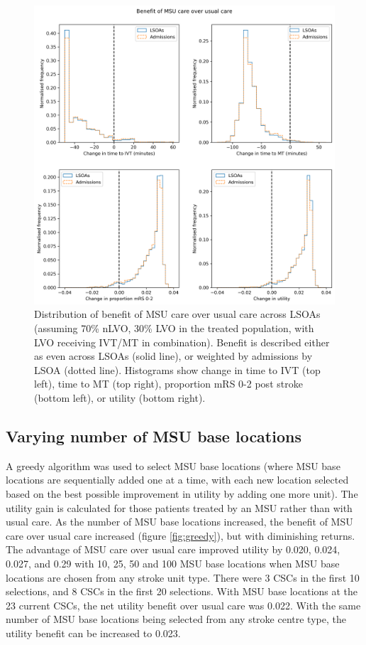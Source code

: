 \begin{figure}[h]
    \centering
    \includegraphics[width=0.75\linewidth]{images/histograms.png}
    \caption{Distribution of benefit of MSU care over usual care across LSOAs (assuming 70\% nLVO, 30\% LVO in the treated population, with LVO receiving IVT/MT in combination). Benefit is described either as even across LSOAs (solid line), or weighted by admissions by LSOA (dotted line). Histograms show change in time to IVT (top left), time to MT (top right), proportion mRS 0-2 post stroke (bottom left), or utility (bottom right).}
    \label{fig:msu_histograms}
\end{figure}

\subsection{Varying number of MSU base locations}

A greedy algorithm was used to select MSU base locations (where MSU base locations are sequentially added one at a time, with each new location selected based on the best possible improvement in utility by adding one more unit). The utility gain is calculated for those patients treated by an MSU rather than with usual care. As the number of MSU base locations increased, the benefit of MSU care over usual care increased (figure \ref{fig:greedy}), but with diminishing returns. The advantage of MSU care over usual care improved utility by 0.020, 0.024, 0.027, and 0.29 with 10, 25, 50 and 100 MSU base locations when MSU base locations are chosen from any stroke unit type. There were 3 CSCs in the first 10 selections, and 8 CSCs in the first 20 selections. With MSU base locations at the 23 current CSCs, the net utility benefit over usual care was 0.022. With the same number of MSU base locations being selected from any stroke centre type, the utility benefit can be increased to 0.023.

